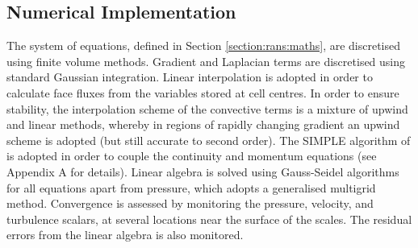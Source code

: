 \documentclass[12pt,oneside,a4paper]{article}
\begin{document}
\subsection{Numerical Implementation}
The system of equations, defined in Section \ref{section:rans:maths}, are discretised
using finite volume methods. Gradient and Laplacian terms are discretised using standard Gaussian integration. Linear interpolation is adopted in order to calculate face fluxes from the variables stored at cell centres. In order to ensure stability, the interpolation scheme of the convective terms is a mixture of upwind and linear methods, whereby in regions of rapidly changing gradient an upwind scheme is adopted (but still accurate to second order). The SIMPLE algorithm of \cite{caretto1973} is adopted in order to couple the continuity and momentum equations (see Appendix A for details). Linear algebra is solved using Gauss-Seidel algorithms for all equations apart from pressure, which adopts a generalised multigrid method. Convergence is assessed by monitoring the pressure, velocity, and turbulence scalars, at several locations near the surface of the scales. The residual errors from the linear algebra is also monitored.
\end{document}
